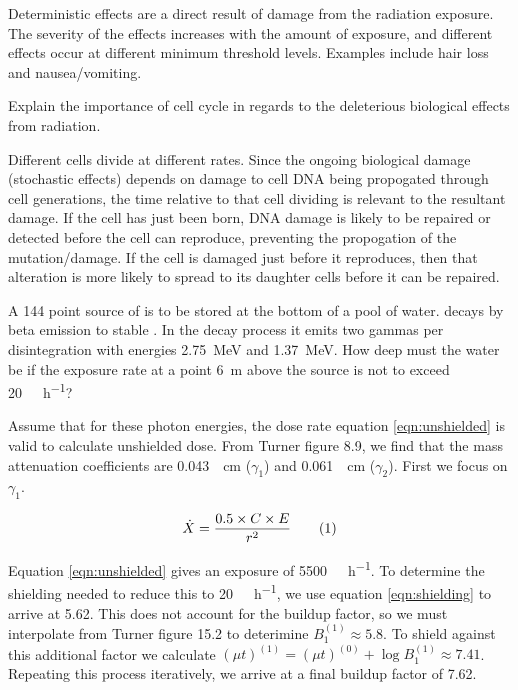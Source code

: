 \documentclass{hw}
\begin{document}
\solution
Deterministic effects are a direct result of damage from the radiation 
exposure. The severity of the effects increases with the amount of exposure, 
and different effects occur at different minimum threshold levels. Examples 
include hair loss and nausea/vomiting.

\problem{}
Explain the importance of cell cycle in regards to the deleterious biological 
effects from radiation.

\solution
Different cells divide at different rates. Since the ongoing biological damage 
(stochastic effects) depends on damage to cell DNA being propogated through 
cell generations, the time relative to that cell dividing is relevant to the 
resultant damage. If the cell has just been born, DNA damage is likely to be 
repaired or detected before the cell can reproduce, preventing the propogation 
of the mutation/damage. If the cell is damaged just before it reproduces, 
then that alteration is more likely to spread to its daughter cells before 
it can be repaired.

\problem{}
A \SI{144}{\curie} point source of  is to be stored at the bottom 
of a pool of water.  decays by beta emission to stable 
. In the decay process it emits two gammas per disintegration with 
energies \SI{2.75}{\mega\electronvolt} and \SI{1.37}{\mega\electronvolt}. How 
deep must the water be if the exposure rate at a point \SI{6}{\meter} above the 
source is not to exceed \SI{20}{\milli\roentgen\per\hour}?

\solution
Assume that for these photon energies, the dose rate equation 
\ref{eqn:unshielded} is valid to calculate unshielded dose. From Turner figure 
8.9, we find that the mass attenuation coefficients are 
\SI{0.043}{\per\centi\meter} ($\gamma_1$) and \SI{0.061}{\per\centi\meter} 
($\gamma_2$). First we focus on $\gamma_1$.

\begin{equation*}
    \label{eqn:unshielded}
    \dot{X} = \frac{0.5 \times C \times E}{r^2} \numberthis
\end{equation*}

Equation \ref{eqn:unshielded} gives an exposure of 
\SI{5500}{\milli\roentgen\per\hour}. To determine the shielding needed to reduce this 
to \SI{20}{\milli\roentgen\per\hour}, we use equation \ref{eqn:shielding} to 
arrive at \num{5.62}. This does not account for the buildup factor, so we must 
interpolate from Turner figure 15.2 to deterimine $B_1^{(1)} \approx 5.8$. To 
shield against this additional factor we calculate $\left(\mu t\right)^{(1)} 
= \left(\mu t\right)^{(0)} + \log{B_1^{(1)}} \approx \num{7.41}$. Repeating 
this process iteratively, we arrive at a final buildup factor of \num{7.62}.
\end{document}
